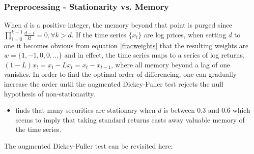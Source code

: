 \documentclass[xcolor=dvipsnames, english, 8pt]{beamer}
\begin{document}
    \begin{frame}
        \frametitle{Preprocessing - Stationarity vs. Memory}
    When $d$ is a positive integer, the memory beyond that point is purged since $\prod_{i=0}^{k-1}\frac{d-i}{k!} =0, \forall k > d$. If the time series $\{x_t\}$ are log prices, when setting $d$ to one it becomes obvious from equation \eqref{fracweights} that the resulting weights are $w = \{1,-1,0,0,\hdots\}$ and in effect, the time series maps to a series of log returns, $(1-L)x_t = x_t - Lx_t = x_t - x_{t-1}$, where all memory beyond a lag of one vanishes. In order to find the {\color{ubRed}optimal order of differencing}, one can gradually increase the order until the augmented Dickey-Fuller test rejects the null hypothesis of non-stationarity.\vspace{0.25cm}\\

\begin{itemize}
    \item \cite{DePrado2018} finds that  {\color{ubRed}many securities are stationary when $d$ is between 0.3 and 0.6} which seems to imply that taking standard returns casts away valuable memory of the time series.
\end{itemize}
\vfill
The augmented Dickey-Fuller test can be revisited here:  \hyperlink{Dickey}{}
        \end{frame}
\end{document}
